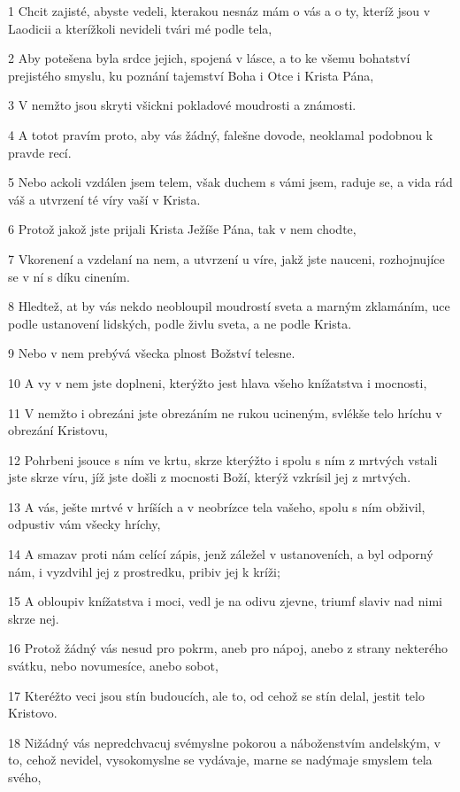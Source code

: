 \par 1 Chcit zajisté, abyste vedeli, kterakou nesnáz mám o vás a o ty, kteríž jsou v Laodicii a kterížkoli nevideli tvári mé podle tela,
\par 2 Aby potešena byla srdce jejich, spojená v lásce, a to ke všemu bohatství prejistého smyslu, ku poznání tajemství Boha i Otce i Krista Pána,
\par 3 V nemžto jsou skryti všickni pokladové moudrosti a známosti.
\par 4 A totot pravím proto, aby vás žádný, falešne dovode, neoklamal podobnou k pravde recí.
\par 5 Nebo ackoli vzdálen jsem telem, však duchem s vámi jsem, raduje se, a vida rád váš a utvrzení té víry vaší v Krista.
\par 6 Protož jakož jste prijali Krista Ježíše Pána, tak v nem chodte,
\par 7 Vkorenení a vzdelaní na nem, a utvrzení u víre, jakž jste nauceni, rozhojnujíce se v ní s díku cinením.
\par 8 Hledtež, at by vás nekdo neobloupil moudrostí sveta a marným zklamáním, uce podle ustanovení lidských, podle živlu sveta, a ne podle Krista.
\par 9 Nebo v nem prebývá všecka plnost Božství telesne.
\par 10 A vy v nem jste doplneni, kterýžto jest hlava všeho knížatstva i mocnosti,
\par 11 V nemžto i obrezáni jste obrezáním ne rukou ucineným, svlékše telo hríchu v obrezání Kristovu,
\par 12 Pohrbeni jsouce s ním ve krtu, skrze kterýžto i spolu s ním z mrtvých vstali jste skrze víru, jíž jste došli z mocnosti Boží, kterýž vzkrísil jej z mrtvých.
\par 13 A vás, ješte mrtvé v hríších a v neobrízce tela vašeho, spolu s ním obživil, odpustiv vám všecky hríchy,
\par 14 A smazav proti nám celící zápis, jenž záležel v ustanoveních, a byl odporný nám, i vyzdvihl jej z prostredku, pribiv jej k kríži;
\par 15 A obloupiv knížatstva i moci, vedl je na odivu zjevne, triumf slaviv nad nimi skrze nej.
\par 16 Protož žádný vás nesud pro pokrm, aneb pro nápoj, anebo z strany nekterého svátku, nebo novumesíce, anebo sobot,
\par 17 Kteréžto veci jsou stín budoucích, ale to, od cehož se stín delal, jestit telo Kristovo.
\par 18 Nižádný vás nepredchvacuj svémyslne pokorou a náboženstvím andelským, v to, cehož nevidel, vysokomyslne se vydávaje, marne se nadýmaje smyslem tela svého,
